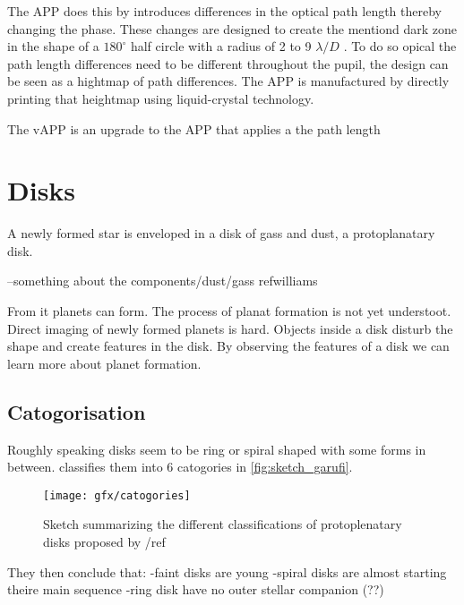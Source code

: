 The APP does this by introduces differences in the optical path length thereby changing the phase. These changes are designed to create the mentiond dark zone in the shape of a $180^\circ$ half circle with a radius of 2 to 9 $\lambda/D$ \cite{vAPP_vs_APP}. To do so opical the path length differences need to be different throughout the pupil, the design can be seen as a hightmap of path differences. The APP is manufactured by directly printing that heightmap using liquid-crystal technology. 

The vAPP is an upgrade to the APP that applies a the path length 






\section{Disks} %
\label{sec:disks} %

A newly formed star is enveloped in a disk of gass and dust, a protoplanatary disk.

--something about the components/dust/gass ref{williams}

From it planets can form. The process of planat formation is not yet understoot. Direct imaging of newly formed planets is hard. Objects inside a disk disturb the shape and create features in the disk. By observing the features of a disk we can learn more about planet formation.

\subsection{Catogorisation}

Roughly speaking disks seem to be ring or spiral shaped with some forms in between. \cite{garufi} classifies them into 6 catogories in \autoref{fig:sketch_garufi}. 

\begin{figure}[h]
    \caption{Sketch summarizing the different classifications of protoplenatary disks proposed by /ref}
    \centering
    \texttt{[image: gfx/catogories]}
    \label{fig:sketch_garufi}
\end{figure}

They then conclude that: 
-faint disks are young
-spiral disks are almost starting theire main sequence
-ring disk have no outer stellar companion (??)  

